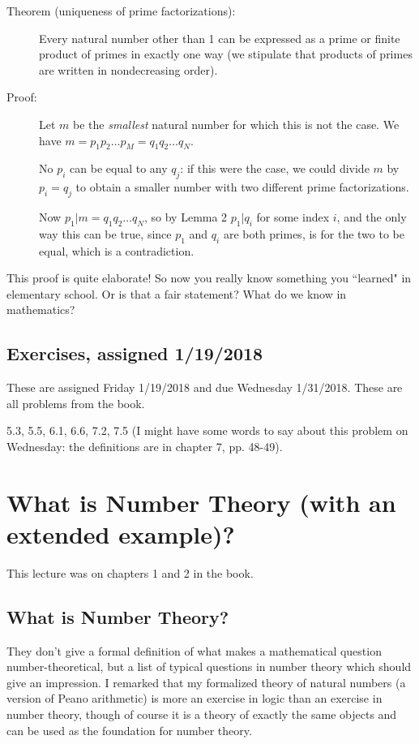 \documentclass[12pt]{article}
\begin{document}
\begin{description}
\item[Theorem (uniqueness of prime factorizations):]  Every natural number other than 1 can be expressed as a prime or finite product of primes in exactly one way (we stipulate that products of primes are written in nondecreasing order).

\item[Proof:]  Let $m$ be the {\em smallest\/} natural number for which this is not the case.   We have
$m=p_1p_2\ldots p_M = q_1q_2\ldots q_N$.

No $p_i$ can be equal to any $q_j$:  if this were the case, we could divide $m$ by $p_i=q_j$ to obtain a smaller number with two different prime factorizations.

Now $p_1 | m=q_1q_2\ldots q_N$, so by Lemma 2 $p_1 | q_i$ for some index $i$, and the only way this can be true, since $p_1$ and $q_i$ are both primes, is for the two to be equal, which is a contradiction.



\end{description}

This proof is quite elaborate!    So now you really know something you ``learned" in elementary school.  Or is that a fair statement?  What do we know in mathematics?

\subsection{Exercises, assigned 1/19/2018}

These are assigned Friday 1/19/2018 and due Wednesday 1/31/2018.  These are all problems from the book.

5.3, 5.5, 6.1, 6.6, 7.2, 7.5 (I might have  some words to say about this problem on Wednesday:  the definitions are in chapter 7, pp. 48-49).

\section{What is Number Theory (with an extended example)?}

This lecture was on chapters 1 and 2 in the book.

\subsection{What is Number Theory?}

They don't give a formal definition of what makes a mathematical question number-theoretical, but a list of typical questions in number theory which should give an impression.   I remarked that my formalized theory of natural numbers (a version of Peano arithmetic) is more an exercise in logic than an exercise in number theory, though of course it is a theory of exactly the same objects and can be used as the foundation for number theory.
\end{document}
